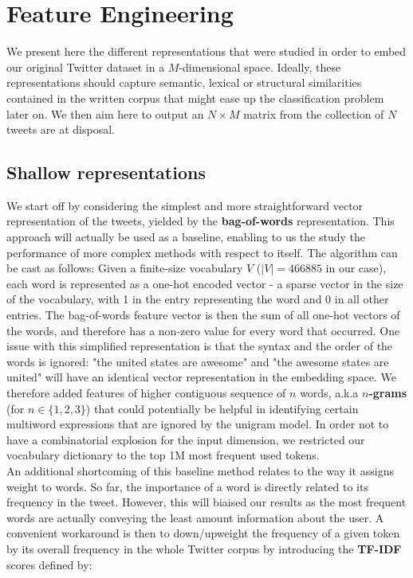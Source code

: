 \documentclass[10pt,conference,compsocconf,retainorgcmds]{IEEEtran}
\begin{document}
\section  {Feature Engineering}
We present here the different representations that were studied in order to embed our original Twitter dataset in a $M$-dimensional space. Ideally, these representations should capture semantic, lexical or structural similarities contained in the written corpus that might ease up the classification problem later on. We then aim here to output an $N\times M$ matrix from the collection of $N$ tweets are at disposal.

\subsection{Shallow representations}
We start off by considering the simplest and more straightforward vector representation of the tweets, yielded by the \textbf{bag-of-words} representation. This approach will actually be used as a baseline, enabling to us the study the performance of more complex methods with respect to itself. The algorithm can be cast as follows: Given a finite-size vocabulary $V$ ($|V|=466885$ in our case), each word is represented as a one-hot encoded vector - a sparse vector in the size of the vocabulary, with 1 in the entry representing the word and 0 in all other entries. The bag-of-words feature vector is then the sum of all one-hot vectors of the words, and therefore has a non-zero value for every word that occurred. One issue with this simplified representation is that the syntax and the order of the words is ignored: "the united states are awesome" and "the awesome states are united" will have an identical vector representation in the embedding space. We therefore added features of higher contiguous sequence of $n$ words, a.k.a \textbf{$n$-grams} (for $n\in \{1,2,3\}$) that could potentially be helpful in identifying certain multiword expressions that are ignored by the unigram model. In order not to have a combinatorial explosion for the input dimension, we restricted our vocabulary dictionary to the top 1M most frequent used tokens.\\
An additional shortcoming of this baseline method relates to the way it assigns weight to words. So far, the importance of a word is directly related to its frequency in the tweet. However, this will biaised our results as the most frequent words are actually conveying the least amount information about the user. A convenient workaround is then to  down/upweight the frequency of a given token by its overall frequency in the whole Twitter corpus by introducing the\textbf{ TF-IDF} scores defined by:
\end{document}
